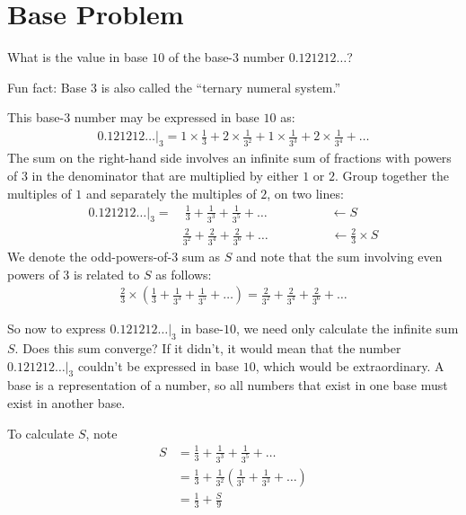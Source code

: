 \documentclass[12pt]{article}
\begin{document}
\section*{Base Problem}
What is the value in base $10$ of the base-$3$ number $0.121212\ldots$? 

\bigskip 

Fun fact: Base $3$ is also called the ``ternary numeral system.'' 

\begin{answer}
This base-$3$ number may be expressed in base $10$ as: 
\begin{align*}
0.121212\ldots|_{3} 
= 1 \times \frac{1}{3} + 2 \times \frac{1}{3^2} + 1 \times \frac{1}{3^3} + 2 \times \frac{1}{3^4} + \ldots 
\end{align*}
The sum on the right-hand side involves an infinite sum of fractions with powers of $3$ in the denominator that are multiplied by either $1$ or $2$. Group together the multiples of $1$ and separately the multiples of $2$, on two lines: 
\begin{align*}
0.121212\ldots|_{3} =
& ~\frac{1}{3} + \frac{1}{3^{3}} + \frac{1}{3^{5}} + \ldots 
\hspace{5em}\leftarrow S\\
& \frac{2}{3^2} + \frac{2}{3^{4}} + \frac{2}{3^{6}} + \ldots 
\hspace{5em}\leftarrow \frac{2}{3} \times S
\end{align*}
We denote the odd-powers-of-$3$ sum as $S$ and note that the sum involving even powers of $3$ is related to $S$ as follows:
\begin{align*}
\frac{2}{3} \times \left(\frac{1}{3} + \frac{1}{3^{3}} + \frac{1}{3^{5}} + \ldots\right)
= \frac{2}{3^2} + \frac{2}{3^{4}} + \frac{2}{3^{6}} + \ldots 
\end{align*}

So now to express $0.121212\ldots|_{3}$ in base-$10$, we need only calculate the infinite sum $S$. Does this sum converge? If it didn't, it would mean that the number $0.121212\ldots|_{3}$ couldn't be expressed in base $10$, which would be extraordinary. A base is a representation of a number, so all numbers that exist in one base must exist in another base.

To calculate $S$, note
\begin{align*}
S & = \frac{1}{3} + \frac{1}{3^{3}} + \frac{1}{3^{5}} + \ldots \\
  & = \frac{1}{3} + \frac{1}{3^2} \left(\frac{1}{3^{1}} + \frac{1}{3^{3}} + \ldots\right) \\
& = \frac{1}{3} + \frac{S}{9}
\end{align*}


\end{answer}
\end{document}
